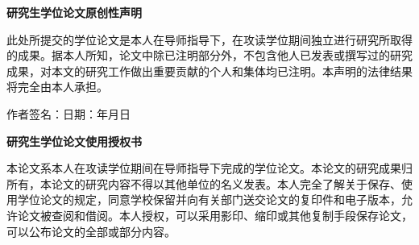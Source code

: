 
\pagestyle{empty}

\setlength{\parindent}{2\ccwd}
\setlength{\parskip}{0pt}
\renewcommand{\baselinestretch}{1.4}

\begin{center}
  {\heiti\bfseries{}\schoolName\zufeDegreeName 研究生学位论文原创性声明}
\end{center}

\vspace{8mm}


{\songti
此处所提交的\zufeDegreeName 学位论文是本人在导师指导下，在\schoolName 攻读\zufeDegreeName 学位期间独立进行研究所取得的成果。据本人所知，论文中除已注明部分外，不包含他人已发表或撰写过的研究成果，对本文的研究工作做出重要贡献的个人和集体均已注明。本声明的法律结果将完全由本人承担。\par}

\vspace{12mm}

\begin{center}
  {\songti 作者签名：\hspace{50mm}日期：\hspace{6mm}年\hspace{6mm}月\hspace{6mm}日}
\end{center}

\vspace{28mm}

\begin{center}
  {\heiti\bfseries{}\schoolName\zufeDegreeName 研究生学位论文使用授权书}
\end{center}

\vspace{8mm}

{\songti
本论文系本人在\schoolName 攻读\zufeDegreeName 学位期间在导师指导下完成的\zufeDegreeName 学位论文。本论文的研究成果归\schoolName 所有，本论文的研究内容不得以其他单位的名义发表。本人完全了解\schoolName 关于保存、使用学位论文的规定，同意学校保留并向有关部门送交论文的复印件和电子版本，允许论文被查阅和借阅。本人授权\schoolName ，可以采用影印、缩印或其他复制手段保存论文，可以公布论文的全部或部分内容。\par}

\vspace{12mm}

